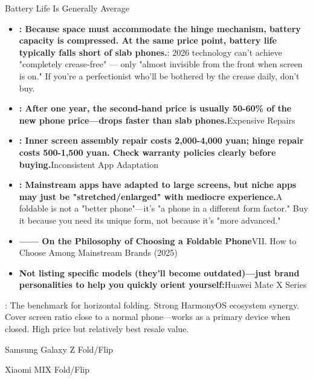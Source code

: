 
Battery Life Is Generally Average

\begin{itemize}
  \item \textbf{: Because space must accommodate the hinge mechanism, battery capacity is compressed. At the same price point, battery life typically falls short of slab phones.}: 2026 technology can't achieve "completely crease-free" — only "almost invisible from the front when screen is on." If you're a perfectionist who'll be bothered by the crease daily, don't buy.
  \item \textbf{: After one year, the second-hand price is usually 50-60\% of the new phone price—drops faster than slab phones.}Expensive Repairs
  \item \textbf{: Inner screen assembly repair costs 2,000-4,000 yuan; hinge repair costs 500-1,500 yuan. Check warranty policies clearly before buying.}Inconsistent App Adaptation
  \item \textbf{: Mainstream apps have adapted to large screens, but niche apps may just be "stretched/enlarged" with mediocre experience.}A foldable is not a "better phone"—it's "a phone in a different form factor." Buy it because you need its unique form, not because it's "more advanced."
  \item \textbf{—— On the Philosophy of Choosing a Foldable Phone}VII. How to Choose Among Mainstream Brands (2025)
  \item \textbf{Not listing specific models (they'll become outdated)—just brand personalities to help you quickly orient yourself:}Huawei Mate X Series
\end{itemize}

: The benchmark for horizontal folding. Strong HarmonyOS ecosystem synergy. Cover screen ratio close to a normal phone—works as a primary device when closed. High price but relatively best resale value.

Samsung Galaxy Z Fold/Flip


Xiaomi MIX Fold/Flip

